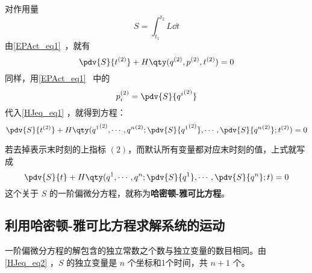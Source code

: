 
对作用量
\begin{equation}
S=\int_{t_1}^{t_2}L\dd t
\end{equation}
由\autoref{EPAct_eq1}~，就有
\begin{equation}\label{HJeq_eq1}
\pdv{S}{t^{(2)}}+H\qty(q^{(2)},p^{(2)},t^{(2)})=0
\end{equation}
同样，用\autoref{EPAct_eq1}~ 中的
\begin{equation}
p_i^{(2)}=\pdv{S}{{q^i}^{(2)}}
\end{equation}
代入\autoref{HJeq_eq1} ，就得到方程：
\begin{equation}
\pdv{S}{t^{(2)}}+H\qty({q^1}^{(2)},\cdots,{q^n}^{(2)};\pdv{S}{{q^1}^{(2)}},\cdots,\pdv{S}{{q^n}^{(2)}};t^{(2)})=0
\end{equation}

若去掉表示末时刻的上指标 $(2)$，而默认所有变量都对应末时刻的值，上式就写成
\begin{equation}\label{HJeq_eq2}
\pdv{S}{t}+H\qty({q^1},\cdots,{q^n};\pdv{S}{{q^1}},\cdots,\pdv{S}{{q^n}};t)=0
\end{equation}
这个关于 $S$ 的一阶偏微分方程，就称为\textbf{哈密顿-雅可比方程}。
\subsection{利用哈密顿-雅可比方程求解系统的运动}
一阶偏微分方程的解包含的独立常数之个数与独立变量的数目相同。由\autoref{HJeq_eq2} ，$S$ 的独立变量是 $n$ 个坐标和1个时间，共 $n+1$ 个。 
